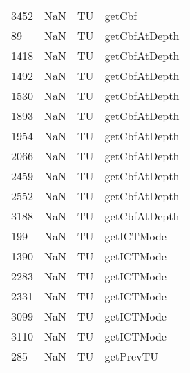 \begin{tabular}{llll}
3452 &                   NaN &                         TU &                                    getCbf \\
89   &                   NaN &                         TU &                             getCbfAtDepth \\
1418 &                   NaN &                         TU &                             getCbfAtDepth \\
1492 &                   NaN &                         TU &                             getCbfAtDepth \\
1530 &                   NaN &                         TU &                             getCbfAtDepth \\
1893 &                   NaN &                         TU &                             getCbfAtDepth \\
1954 &                   NaN &                         TU &                             getCbfAtDepth \\
2066 &                   NaN &                         TU &                             getCbfAtDepth \\
2459 &                   NaN &                         TU &                             getCbfAtDepth \\
2552 &                   NaN &                         TU &                             getCbfAtDepth \\
3188 &                   NaN &                         TU &                             getCbfAtDepth \\
199  &                   NaN &                         TU &                                getICTMode \\
1390 &                   NaN &                         TU &                                getICTMode \\
2283 &                   NaN &                         TU &                                getICTMode \\
2331 &                   NaN &                         TU &                                getICTMode \\
3099 &                   NaN &                         TU &                                getICTMode \\
3110 &                   NaN &                         TU &                                getICTMode \\
285  &                   NaN &                         TU &                                 getPrevTU \\

\end{tabular}
